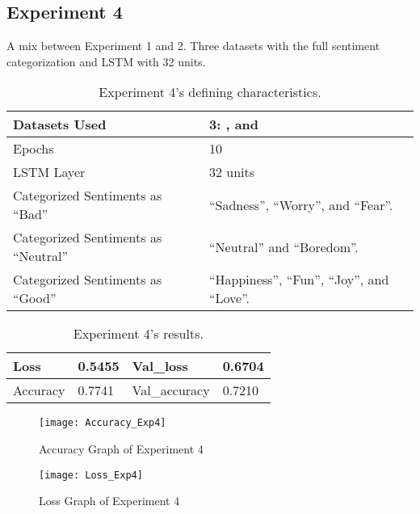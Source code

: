 \subsection{Experiment 4}
A mix between Experiment 1 and 2. Three datasets with the full sentiment categorization and LSTM with 32 units.
\begin{table}[!h]
	\caption{Experiment 4's defining characteristics.}
	\vspace{0.5cm}
	\centering
	\begin{tabular}[t]{|l|l|}
	\hline
		Datasets Used & \makecell{3: \citet{d1}, \citet{d2} and\\ \citet{d3}}
	\\ \hline
		Epochs & 10
	\\ \hline
		LSTM Layer & 32 units
	\\ \hline
		Categorized Sentiments as ``Bad'' & ``Sadness'', ``Worry'', and ``Fear''.
	\\ \hline	
		 Categorized Sentiments as ``Neutral'' & ``Neutral'' and ``Boredom''.
	\\ \hline	
		Categorized Sentiments as ``Good'' & ``Happiness'', ``Fun'', ``Joy'', and ``Love''.
	\\ \hline
	\end{tabular}
\end{table}

\begin{table}[!b]
	\caption{Experiment 4's results.}
	\vspace{0.5cm}
	\centering
	\begin{tabular}[t]{|l|l|l|l|}
	\hline
		Loss & 0.5455 & Val\_loss & 0.6704
	\\ \hline
		Accuracy & 0.7741 & Val\_accuracy & 0.7210
	\\ \hline
	\end{tabular}
\end{table}


\begin{figure}[!h]
	\centering
	\texttt{[image: Accuracy\_Exp4]}
	\caption{Accuracy Graph of Experiment 4}
	\label{fig:accuracy_exp4}
	\texttt{[image: Loss\_Exp4]}
	\caption{Loss Graph of Experiment 4}
	\label{fig:loss_exp4}
\end{figure}
\pagebreak

